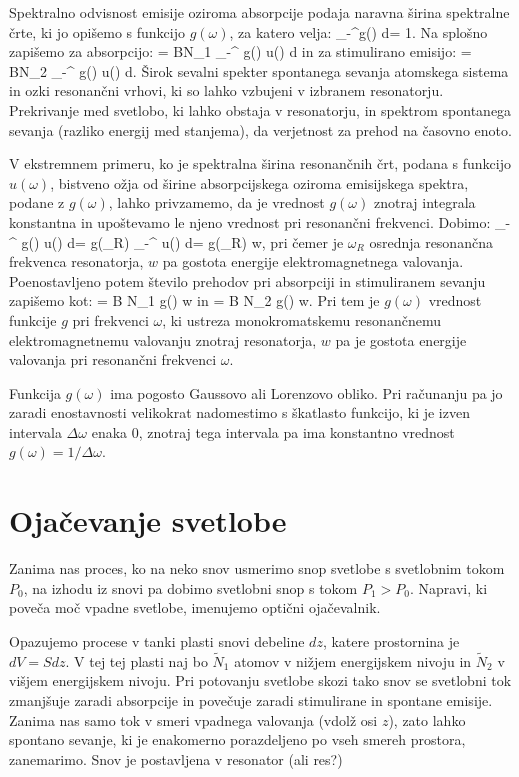Spektralno odvisnost emisije oziroma absorpcije podaja naravna širina spektralne 
črte, ki jo opišemo s funkcijo $g(\omega)$, za katero velja:
\beq
\int_{-\infty}^\infty g(\omega) d\omega = 1.
\eeq
Na splošno zapišemo za absorpcijo:
\beq
{} = BN_1 \int_{-\infty}^{\infty} g(\omega) u(\omega) d\omega
\eeq
in za stimulirano emisijo:
\beq
{} = BN_2 \int_{-\infty}^{\infty} g(\omega) u(\omega) d\omega.
\eeq
Širok sevalni spekter spontanega sevanja atomskega sistema in ozki resonančni vrhovi, 
ki so lahko vzbujeni v izbranem resonatorju. Prekrivanje med svetlobo, ki lahko obstaja
v resonatorju, in spektrom spontanega sevanja (razliko energij med stanjema), 
da verjetnost za prehod na časovno enoto.

V ekstremnem primeru, ko je spektralna širina resonančnih črt, 
podana s funkcijo $u(\omega)$, bistveno ožja od širine absorpcijskega oziroma
emisijskega spektra, podane z $g(\omega)$, lahko privzamemo, da je vrednost $g(\omega)$
znotraj integrala konstantna in upoštevamo le njeno vrednost pri resonančni frekvenci.
Dobimo:
\beq
\int_{-\infty}^{\infty} g(\omega) u(\omega) d\omega = g(\omega_R) \int_{-\infty}^{\infty}
u(\omega) d\omega = g(\omega_R) w,
\eeq
pri čemer je $\omega_R$ osrednja resonančna frekvenca resonatorja, $w$ pa gostota
energije elektromagnetnega valovanja. Poenostavljeno potem število prehodov pri absorpciji
in stimuliranem sevanju zapišemo kot:
\beq
{} = B N_1 g(\omega) w
\eeq
in
\beq
{} = B N_2 g(\omega) w.
\eeq
Pri tem je $g(\omega)$ vrednost funkcije $g$ pri frekvenci $\omega$, ki ustreza monokromatskemu
resonančnemu elektromagnetnemu valovanju znotraj resonatorja, $w$ pa je gostota
energije valovanja pri resonančni frekvenci $\omega$. 

Funkcija $g(\omega)$ ima pogosto Gaussovo ali Lorenzovo obliko. Pri računanju pa jo
zaradi enostavnosti velikokrat nadomestimo s škatlasto funkcijo, ki je izven intervala $\Delta \omega$
enaka 0, znotraj tega intervala pa ima konstantno vrednost $g(\omega) = 1/\Delta \omega$.

\section{Ojačevanje svetlobe}
Zanima nas proces, ko na neko snov usmerimo snop svetlobe s svetlobnim tokom $P_0$, na izhodu
iz snovi pa dobimo svetlobni snop s tokom $P_1 > P_0$.  Napravi, ki poveča moč vpadne svetlobe, 
imenujemo optični ojačevalnik. 

Opazujemo procese v tanki plasti snovi debeline $dz$, katere prostornina je $dV = S dz$. V
tej tej plasti naj bo $\tilde{N}_1$ atomov v nižjem energijskem nivoju in $\tilde{N}_2$ 
v višjem energijskem nivoju.
Pri potovanju svetlobe skozi tako snov se svetlobni tok zmanjšuje zaradi absorpcije in povečuje
zaradi stimulirane in spontane emisije. Zanima nas samo tok v smeri vpadnega valovanja (vdolž osi
$z$), zato lahko spontano sevanje, ki je enakomerno porazdeljeno po vseh smereh prostora, zanemarimo.
Snov je postavljena v resonator (ali res?)

